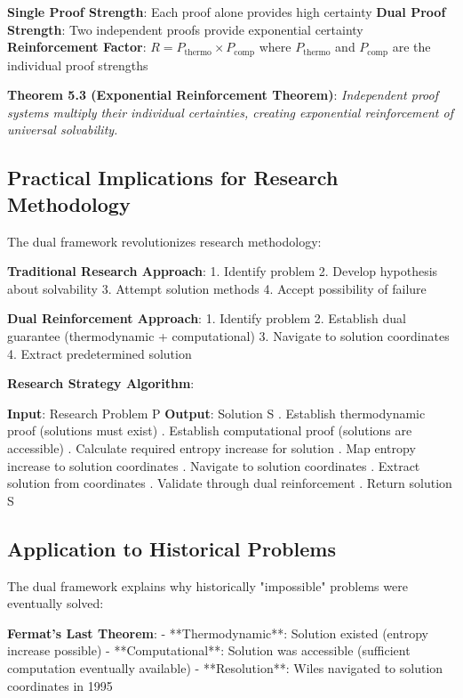 \documentclass[12pt,a4paper]{article}
\theoremstyle{definition}
\begin{document}
{\textbf{Single Proof Strength}: Each proof alone provides high certainty
\textbf{Dual Proof Strength}: Two independent proofs provide exponential certainty
\textbf{Reinforcement Factor}: $R = P_{\text{thermo}} \times P_{\text{comp}}$ where $P_{\text{thermo}}$ and $P_{\text{comp}}$ are the individual proof strengths

\textbf{Theorem 5.3 (Exponential Reinforcement Theorem)}: \textit{Independent proof systems multiply their individual certainties, creating exponential reinforcement of universal solvability.}

\subsection{Practical Implications for Research Methodology}

The dual framework revolutionizes research methodology:

\textbf{Traditional Research Approach}:
1. Identify problem
2. Develop hypothesis about solvability
3. Attempt solution methods
4. Accept possibility of failure

\textbf{Dual Reinforcement Approach}:
1. Identify problem
2. Establish dual guarantee (thermodynamic + computational)
3. Navigate to solution coordinates
4. Extract predetermined solution

\textbf{Research Strategy Algorithm}:
\begin{algorithmic}
\STATE \textbf{Input}: Research Problem P
\STATE \textbf{Output}: Solution S
\STATE
{}. Establish thermodynamic proof (solutions must exist)
. Establish computational proof (solutions are accessible)
. Calculate required entropy increase for solution
. Map entropy increase to solution coordinates
. Navigate to solution coordinates
. Extract solution from coordinates
. Validate through dual reinforcement
. Return solution S
\end{algorithmic}

\subsection{Application to Historical Problems}

The dual framework explains why historically "impossible" problems were eventually solved:

\textbf{Fermat's Last Theorem}:
- **Thermodynamic**: Solution existed (entropy increase possible)
- **Computational**: Solution was accessible (sufficient computation eventually available)
- **Resolution**: Wiles navigated to solution coordinates in 1995

}
\end{document}
